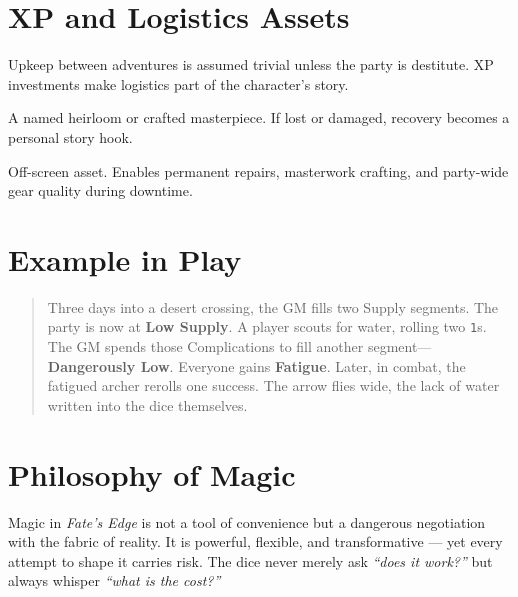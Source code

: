 \documentclass[12pt]{article}
\begin{document}
\section{XP and Logistics Assets}
Upkeep between adventures is assumed trivial unless the party is destitute.
XP investments make logistics part of the character’s story.

\begin{description}[leftmargin=2cm]
  \item[4 XP: Signature Weapon] A named heirloom or crafted masterpiece.
    If lost or damaged, recovery becomes a personal story hook.
  \item[8 XP: Superior Workshop] Off-screen asset. Enables permanent repairs,
    masterwork crafting, and party-wide gear quality during downtime.
\end{description}

\section{Example in Play}
\begin{quote}
Three days into a desert crossing, the GM fills two Supply segments. The party
is now at \textbf{Low Supply}.  
A player scouts for water, rolling two \texttt{1}s. The GM spends those
Complications to fill another segment—\textbf{Dangerously Low}. Everyone gains
\textbf{Fatigue}.  
Later, in combat, the fatigued archer rerolls one success. The arrow flies wide,
the lack of water written into the dice themselves.
\end{quote}

\section{Philosophy of Magic}

Magic in \textit{Fate’s Edge} is not a tool of convenience but a dangerous negotiation with the fabric of reality.  
It is powerful, flexible, and transformative — yet every attempt to shape it carries risk. The dice never merely ask \emph{“does it work?”} but always whisper \emph{“what is the cost?”}
\end{document}
